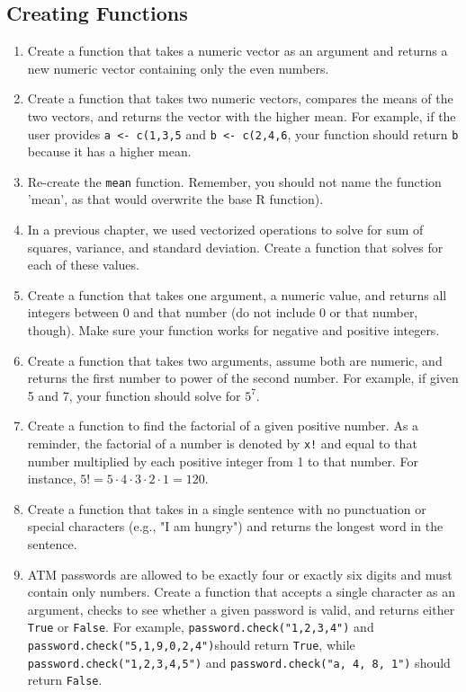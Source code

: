 \documentclass[letterpaper,12pt]{article}
\begin{document}
\subsection{Creating Functions}

\begin{enumerate}
    \item Create a function that takes a numeric vector as an argument and returns a new numeric vector containing only the even numbers. 
    \item Create a function that takes two numeric vectors, compares the means of the two vectors, and returns the vector with the higher mean. For example, if the user provides \verb|a <- c(1,3,5| and \verb|b <- c(2,4,6|, your function should return \verb|b| because it has a higher mean. 
    \item Re-create the \verb|mean| function. Remember, you should not name the function 'mean', as that would overwrite the base R function).
    \item In a previous chapter, we used vectorized operations to solve for sum of squares, variance, and standard deviation. Create a function that solves for each of these values. 
    \item Create a function that takes one argument, a numeric value, and returns all integers between 0 and that number (do not include 0 or that number, though). Make sure your function works for negative and positive integers. 
    \item Create a function that takes two arguments, assume both are numeric, and returns the first number to power of the second number. For example, if given 5 and 7, your function should solve for $5^7$. 
    \item Create a function to find the factorial of a given positive number. As a reminder, the factorial of a number is denoted by \verb|x!| and equal to that number multiplied by each positive integer from 1 to that number. For instance, $5!=5\cdot 4 \cdot 3 \cdot 2 \cdot 1 = 120$.
    \item Create a function that takes in a single sentence with no punctuation or special characters (e.g., "I am hungry") and returns the longest word in the sentence.
    \item ATM passwords are allowed to be exactly four or exactly six digits and must contain only numbers. Create a function that accepts a single character as an argument, checks to see whether a given password is valid, and returns either \verb|True| or \verb|False|. For example, \verb|password.check("1,2,3,4")| and \verb|password.check("5,1,9,0,2,4")|should return \verb|True|, while \verb|password.check("1,2,3,4,5")| and \verb|password.check("a, 4, 8, 1")| should return \verb|False|.

\end{enumerate}
\end{document}
